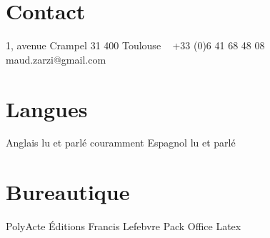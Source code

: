 \documentclass[]{friggeri-cv} %
\begin{document}


\begin{aside} %
\section{Contact}
1, avenue Crampel
31 400 Toulouse
~
+33 (0)6 41 68 48 08
~
maud.zarzi@gmail.com
\section{Langues}
Anglais lu et parlé couramment
Espagnol lu et parlé
\section{Bureautique}
PolyActe
Éditions Francis Lefebvre
Pack Office
Latex
\end{aside}
\end{document}
